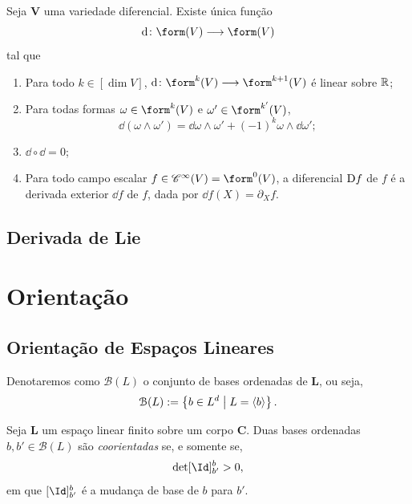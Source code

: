 \begin{prop}
Seja $\bm V$ uma variedade diferencial. Existe única função
	\begin{equation*}
	\dd\colon \form(V) \to \form(V)
	\end{equation*}
tal que
	\begin{enumerate}
	\item Para todo $k \in [\dim V]$, $\dd\colon \form^k(V) \to \form^{k+1}(V)$ é linear sobre $\mathbb{R}$;
	\item  Para todas formas $\omega \in \form^k (V)$ e $\omega' \in \form^{k'} (V)$,
		\begin{equation*}
		\dd(\omega \wedge \omega') = \dd\omega \wedge \omega' + (-1)^k\omega \wedge \dd \omega';
		\end{equation*}
	\item $\dd \circ \dd = 0$;
	\item Para todo campo escalar $f \in \cont^\infty(V) = \form^0(V)$, a diferencial $\mathrm{D} f$ de $f$ é a derivada exterior $\dd f$ de $f$, dada por $\dd f(X) = \partial_X f$.
	\end{enumerate}
\end{prop}








\subsection{Derivada de Lie}














\section{Orientação}

\subsection{Orientação de Espaços Lineares}

Denotaremos como $\mathcal{B}(L)$ o conjunto de bases ordenadas de $\bm L$, ou seja,
	\begin{equation*}
	\mathcal{B}(L) := \left\{b \in L^d \;\middle\vert\; L = \left\langle b \right\rangle \right\}.
	\end{equation*}

\begin{defi}
Seja $\bm L$ um espaço linear finito sobre um corpo $\bm C$. Duas bases ordenadas $b, b' \in \mathcal{B}(L)$ são \emph{coorientadas} se, e somente se,
	\begin{equation*}
	\det [\Id]^b_{b'} > 0,
	\end{equation*}
em que $[\Id]_{b'}^b$ é a mudança de base de $b$ para $b'$.
\end{defi}

